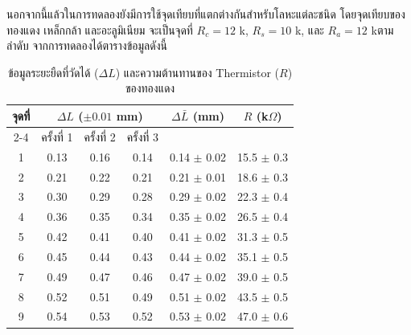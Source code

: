 \documentclass[11pt,a4paper]{article}
\begin{document}
\bigskip
นอกจากนี้แล้วในการทดลองยังมีการใช้จุดเทียบที่แตกต่างกันสำหรับโลหะแต่ละชนิด โดยจุดเทียบของทองแดง เหล็กกล้า และอะลูมิเนียม จะเป็นจุดที่ $R_c= 12$ k\ohm, $R_s = 10$ k\ohm, และ $R_a = 12$ k\ohm \space ตามลำดับ
จากการทดลองได้ตารางข้อมูลดังนี้

\begin{table}[htbp]
\centering
\caption{ข้อมูลระยะยืดที่วัดได้ ($\Delta L$) และความต้านทานของ Thermistor ($R$) ของทองแดง}
\renewcommand{\arraystretch}{1.2}
\begin{tabular}{|c|ccc|c|c|}
\hline
จุดที่ 
& \multicolumn{3}{c|}{$\Delta L$ ($\pm 0.01$ mm)} 
& $\Delta \bar L$ (mm)
& $R$ (k$\Omega$) \\
\cline{2-4}
& ครั้งที่ 1 & ครั้งที่ 2 & ครั้งที่ 3 & & \\
\hline
1 & 0.13 & 0.16 & 0.14 & 0.14 $\pm$ 0.02 & 15.5 $\pm$ 0.3 \\
2 & 0.21 & 0.22 & 0.21 & 0.21 $\pm$ 0.01 & 18.6 $\pm$ 0.3 \\
3 & 0.30 & 0.29 & 0.28 & 0.29 $\pm$ 0.02 & 22.3 $\pm$ 0.4 \\
4 & 0.36 & 0.35 & 0.34 & 0.35 $\pm$ 0.02 & 26.5 $\pm$ 0.4 \\
5 & 0.42 & 0.41 & 0.40 & 0.41 $\pm$ 0.02 & 31.3 $\pm$ 0.5 \\
6 & 0.45 & 0.44 & 0.43 & 0.44 $\pm$ 0.02 & 35.1 $\pm$ 0.5 \\
7 & 0.49 & 0.47 & 0.46 & 0.47 $\pm$ 0.02 & 39.0 $\pm$ 0.5 \\
8 & 0.52 & 0.51 & 0.49 & 0.51 $\pm$ 0.02 & 43.5 $\pm$ 0.5 \\
9 & 0.54 & 0.53 & 0.52 & 0.53 $\pm$ 0.02 & 47.0 $\pm$ 0.6 \\
\hline
\end{tabular}
\end{table}
\end{document}
